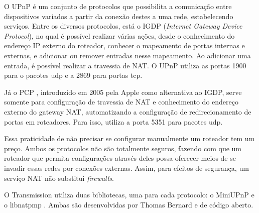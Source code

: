 O UPnP \cite{wiki:upnp} é um conjunto de protocolos que possibilita a comunicação entre
dispositivos variados a partir da conexão destes a uma rede, estabelecendo serviços.
Entre os diversos protocolos, está o IGDP (\emph{Internet Gateway Device Protocol}), no
qual é possível realizar várias ações, desde o conhecimento do endereço IP externo do
roteador, conhecer o mapeamento de portas internas e externas, e adicionar ou remover
entradas nesse mapeamento. Ao adicionar uma entrada, é possível realizar a travessia de
NAT. O UPnP utiliza as portas 1900 para o pacotes \gls*{udp} e a 2869 para portas
\gls*{tcp}.

Já o PCP \cite{wiki:pcp}, introduzido em 2005 pela Apple como alternativa ao IGDP,
serve somente para configuração de travessia de NAT e conhecimento do endereço externo
do gateway NAT, automatizando a configuração de redirecionamento de portas em
roteadores. Para isso, utiliza a porta 5351 para pacotes \gls*{udp}.

Essa praticidade de não precisar se configurar manualmente um roteador tem um preço.
Ambos os protocolos não são totalmente seguros, fazendo com que um roteador que permita
configurações através deles possa oferecer meios de se invadir essas redes por conexões
externas. Assim, para efeitos de segurança, um serviço NAT não substitui
\emph{firewalls}.

O Transmission utiliza duas bibliotecas, uma para cada protocolo: o MiniUPnP
\cite{site:miniupnp} e o libnatpmp \cite{site:libnatpmp}. Ambas são desenvolvidas por
Thomas Bernard e de código aberto.